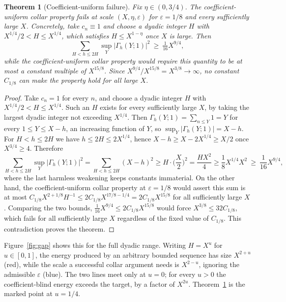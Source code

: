 \documentclass[11pt]{article}
\newtheorem{theorem}{Theorem}[section]
\begin{document}
\begin{theorem}[Coefficient-uniform failure]
\label{thm:uniformfailure}
Fix $\eta\in(0,3/4)$. The coefficient-uniform collar property fails at scale $(X,\eta,\varepsilon)$ for
$\varepsilon=1/8$ and every sufficiently large $X$. Concretely, take $c_n\equiv1$ and choose a dyadic
integer $H$ with $X^{1/4}/2 < H\le X^{1/4}$, which satisfies $H\le X^{1-\eta}$ once $X$ is large. Then
\[
\sum_{H<h\le2H}\sup_{Y}|\Gamma_h(Y;1)|^2\ \ge\ \tfrac1{16} X^{9/4},
\]
while the coefficient-uniform collar property would require this quantity to be at most a constant multiple
of $X^{15/8}$. Since $X^{9/4}/X^{15/8}=X^{3/8}\to\infty$, no constant $C_{1/8}$ can make the property hold
for all large $X$.
\end{theorem}

\begin{proof}
Take $c_n=1$ for every $n$, and choose a dyadic integer $H$ with $X^{1/4}/2 < H\le X^{1/4}$. Such an $H$
exists for every sufficiently large $X$, by taking the largest dyadic integer not exceeding $X^{1/4}$.
Then $\Gamma_h(Y;1)=\sum_{n\le Y}1=Y$ for every $1\le Y\le X-h$, an increasing function of $Y$, so
$\sup_Y|\Gamma_h(Y;1)|=X-h$. For $H<h\le2H$ we have $h\le2H\le2X^{1/4}$, hence
$X-h\ge X-2X^{1/4}\ge X/2$ once $X^{3/4}\ge4$. Therefore
\[
\sum_{H<h\le2H}\sup_Y|\Gamma_h(Y;1)|^2=\sum_{H<h\le2H}(X-h)^2\ge H\cdot\Big(\frac X2\Big)^2
=\frac{H X^2}{4}\ge\frac1{8}X^{1/4}X^2\ \ge\ \frac1{16} X^{9/4},
\]
where the last harmless weakening keeps constants immaterial. On the other hand, the coefficient-uniform
collar property at $\varepsilon=1/8$ would assert this sum is at most
$C_{1/8}X^{2+1/8}H^{-1}\le 2C_{1/8}X^{17/8-1/4}=2C_{1/8}X^{15/8}$ for all sufficiently large $X$. Comparing the
two bounds, $\tfrac1{16}X^{9/4}\le 2C_{1/8}X^{15/8}$ would force $X^{3/8}\le32C_{1/8}$, which fails for all
sufficiently large $X$ regardless of the fixed value of $C_{1/8}$. This contradiction proves the theorem.
\end{proof}

Figure~\ref{fig:gap} shows this for the full dyadic range. Writing $H=X^u$ for $u\in[0,1]$, the energy
produced by an arbitrary bounded sequence has size $X^{2+u}$ (red), while the scale a successful collar
argument needs is $X^{2-u}$, ignoring the admissible $\varepsilon$ (blue). The two lines meet only at
$u=0$; for every $u>0$ the coefficient-blind energy exceeds the target, by a factor of $X^{2u}$.
Theorem~\ref{thm:uniformfailure} is the marked point at $u=1/4$.
\end{document}
